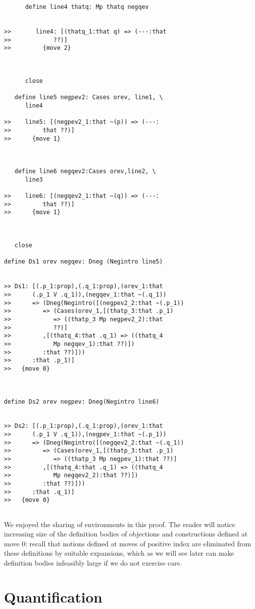 \documentclass[12pt]{article}
\begin{document}
\begin{verbatim}
      define line4 thatq: Mp thatq negqev


>>       line4: [(thatq_1:that q) => (---:that
>>            ??)]
>>         {move 2}



      close

   define line5 negpev2: Cases orev, line1, \
      line4

>>    line5: [(negpev2_1:that ~(p)) => (---:
>>         that ??)]
>>      {move 1}



   define line6 negqev2:Cases orev,line2, \
      line3

>>    line6: [(negqev2_1:that ~(q)) => (---:
>>         that ??)]
>>      {move 1}



   close

define Ds1 orev negqev: Dneg (Negintro line5)


>> Ds1: [(.p_1:prop),(.q_1:prop),(orev_1:that
>>      (.p_1 V .q_1)),(negqev_1:that ~(.q_1))
>>      => (Dneg(Negintro([(negpev2_2:that ~(.p_1))
>>         => (Cases(orev_1,[(thatp_3:that .p_1)
>>            => ((thatp_3 Mp negpev2_2):that
>>            ??)]
>>         ,[(thatq_4:that .q_1) => ((thatq_4
>>            Mp negqev_1):that ??)])
>>         :that ??)]))
>>      :that .p_1)]
>>   {move 0}



define Ds2 orev negpev: Dneg(Negintro line6)


>> Ds2: [(.p_1:prop),(.q_1:prop),(orev_1:that
>>      (.p_1 V .q_1)),(negpev_1:that ~(.p_1))
>>      => (Dneg(Negintro([(negqev2_2:that ~(.q_1))
>>         => (Cases(orev_1,[(thatp_3:that .p_1)
>>            => ((thatp_3 Mp negpev_1):that ??)]
>>         ,[(thatq_4:that .q_1) => ((thatq_4
>>            Mp negqev2_2):that ??)])
>>         :that ??)]))
>>      :that .q_1)]
>>   {move 0}


\end{verbatim}

We enjoyed the sharing of environments in this proof.  The reader will notice increasing size of the definition bodies of objections and constructions defined at move 0:  recall that notions defined at moves of positive index are eliminated from these definitions by suitable expansions, which as we will see later can make definition bodies infeasibly large if we do not exercise care.


\section{Quantification}
\end{document}
